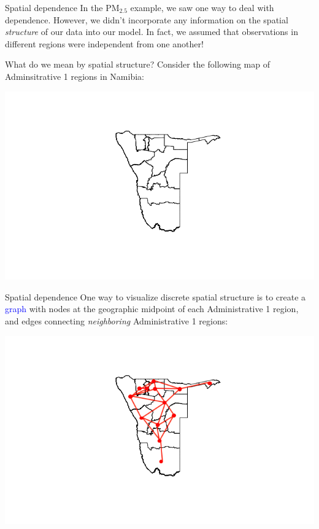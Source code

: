\documentclass[10pt,t]{beamer}
\begin{document}
\begin{frame}{Spatial dependence}
In the $\text{PM}_{2.5}$ example, we saw one way to deal with dependence. However, we didn't incorporate any information on the spatial \textit{structure} of our data into our model. In fact, we assumed that observations in different regions were independent from one another!  

\vspace{0.3cm}

What do we mean by spatial structure? Consider the following map of Adminsitrative 1
regions in Namibia:

\centering \includegraphics[scale=0.4]{namibia_admin1.png}

\end{frame}

\begin{frame}{Spatial dependence}
One way to visualize discrete spatial structure is to create a \textcolor{blue}{graph} with nodes at the geographic midpoint of each Administrative 1 region, and edges connecting \textit{neighboring} Administrative 1 regions:

\vspace{0.3cm}

\centering \includegraphics[scale=0.4]{namibia_admin1_2.png}

\end{frame}
\end{document}
